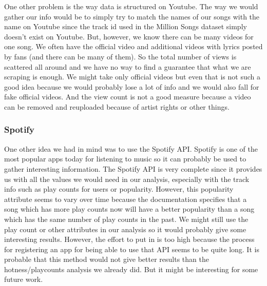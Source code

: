 \documentclass[11pt]{article}
\begin{document}
One other problem is the way data is structured on Youtube. The way we would gather our info would be
to simply try to match the names of our songs with the name on Youtube since the track id used in the
Million Songs dataset simply doesn’t exist on Youtube. But, however, we know there can be many videos
for one song. We often have the official video and additional videos with lyrics posted by fans (and there
can be many of them). So the total number of views is scattered all around and we have no way to find a
guarantee that what we are scraping is enough. We might take only official videos but even that is not
such a good idea because we would probably lose a lot of info and we would also fall for fake official
videos. And the view count is not a good measure because a video can be removed and reuploaded
because of artist rights or other things.

\subsubsection{Spotify}
One other idea we had in mind was to use the Spotify API. Spotify is one of the most
popular apps today for listening to music so it can probably be used to gather interesting information. The
Spotify API is very complete since it provides us with all the values we would need in our analysis,
especially with the track info such as play counts for users or popularity. However, this popularity
attribute seems to vary over time because the documentation specifies that a song which has more play
counts now will have a better popularity than a song which has the same number of play counts in the
past. We might still use the play count or other attributes in our analysis so it would probably give some
interesting results. However, the effort to put in is too high because the process for registering an app for
being able to use that API seems to be quite long. It is probable that this method would not give better
results than the hotness/playcounts analysis we already did. But it might be interesting for some future
work.
\end{document}
